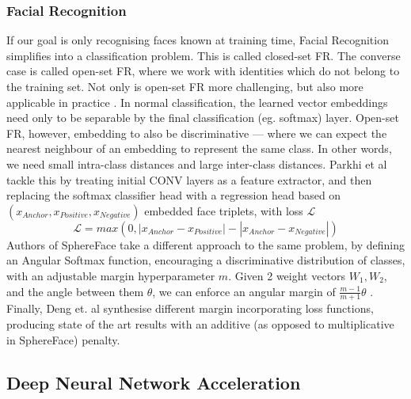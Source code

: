 \documentclass[12pt]{article}
\newcommand{\Loss}{\mathcal{L}}
\begin{document}
\subsubsection{Facial Recognition}
If our goal is only recognising faces known at training time, Facial Recognition simplifies into a classification problem. This is called closed-set FR.
The converse case is called open-set FR, where we work with identities which do not belong to the training set.
Not only is open-set FR more challenging, but also more applicable in practice \cite{liu2017sphereface}.
In normal classification, the learned vector embeddings need only to be separable by the final classification (eg. softmax) layer.
Open-set FR, however, embedding to also be discriminative --- where we can expect the nearest neighbour of an embedding to represent the same class. In other words, we need small intra-class distances and large inter-class distances\cite{deng2019arcface}.
Parkhi et al\cite{parkhi2015deep} tackle this by treating initial CONV layers as a feature extractor, and then replacing the softmax classifier head with a regression head based on $(x_{Anchor}, x_{Positive}, x_{Negative})$ embedded face triplets, with loss $\Loss$ $$\Loss = max(0, |x_{Anchor} - x_{Positive}| - |x_{Anchor} - x_{Negative}|)$$
Authors of SphereFace\cite{liu2017sphereface} take a different approach to the same problem, by defining an Angular Softmax function, encouraging a discriminative distribution of classes, with an adjustable margin hyperparameter $m$.
Given 2 weight vectors $W_1, W_2$, and the angle between them $\theta$, we can enforce an angular margin of $\frac{m-1}{m+1}\theta$ \cite{li2018angular}.
Finally, Deng et. al synthesise different margin incorporating loss functions, producing state of the art results with an additive (as opposed to multiplicative in SphereFace) penalty\cite{deng2019arcface}.
\subsection{Deep Neural Network Acceleration}
\end{document}
